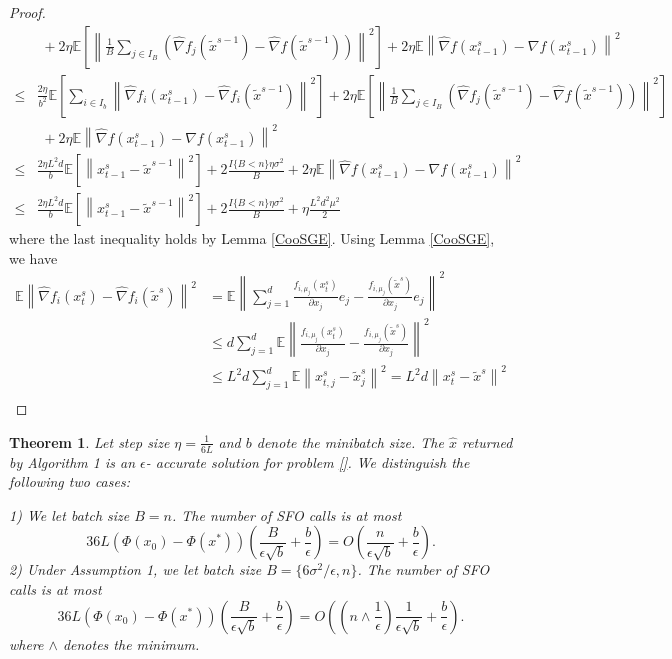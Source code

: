 \documentclass{article}
\newcommand*{\E}{\mathbb{E}}
\newcommand{\norm}[1]{\left\lVert#1\right\rVert}
\newtheorem{theorem}{Theorem}[section]
\theoremstyle{definition}
\theoremstyle{remark}
\begin{document}
\begin{proof}
{\begin{align}
   &\,\, \label{eq27}+ 2\eta \E \left[ \norm{\frac{1}{B}\sum_{j\in I_B}\left(\hat{\nabla} f_j(\widetilde{x}^{s-1}) - \hat{\nabla} f(\tilde{x}^{s-1})\right)}^2\right]+2\eta \E \norm{\hat{\nabla} f(x_{t-1}^s)-\nabla f(x_{t-1}^s)}^2\\
   \leq  &\label{eq28}\frac{2\eta}{b^2}\E\left[\sum_{i\in I_b}\norm{\hat{\nabla} f_i(x_{t-1}^s)-\hat{\nabla} f_i(\widetilde{x}^{s-1})}^2\right]+ 2\eta \E \left[ \norm{\frac{1}{B}\sum_{j\in I_B}\left(\hat{\nabla} f_j(\widetilde{x}^{s-1}) - \hat{\nabla} f(\tilde{x}^{s-1})\right)}^2\right]\\
   &\,\,+2\eta \E \norm{\hat{\nabla} f(x_{t-1}^s)-\nabla f(x_{t-1}^s)}^2\\
   \leq  &\label{eq29}\frac{2\eta L^2 d}{b}\E\left[\norm{x_{t-1}^s-\widetilde{x}^{s-1}}^2\right]+ 2\frac{I\{B < n\}\eta \sigma ^2}{B}+2\eta \E \norm{\hat{\nabla} f(x_{t-1}^s)-\nabla f(x_{t-1}^s)}^2\\
   \leq  &\label{eq29}\frac{2\eta L^2 d}{b}\E\left[\norm{x_{t-1}^s-\widetilde{x}^{s-1}}^2\right]+ 2\frac{I\{B < n\}\eta \sigma ^2}{B}+\eta \frac{L^2 d^2 \mu^2}{2}
 \end{align}
 }
 where the last inequality holds by Lemma \ref{CooSGE}. Using Lemma \ref{CooSGE}, we have 
 \begin{equation}
 \begin{split}
 \E \norm{\hat{\nabla} f_i(x_{t}^s)-\hat{\nabla} f_i(\tilde{x}^s)}^2 &= \E \norm{ \sum_{j=1}^d\frac{f_{i,\mu_j}(x_{t}^s)}{\partial x_j}e_j-\frac{f_{i,\mu_j}(\tilde{x}^s)}{\partial x_j}e_j}^2\\
 &\leq d \sum_{j=1}^d \E \norm{ \frac{f_{i,\mu_j}(x_{t}^s)}{\partial x_j}-\frac{f_{i,\mu_j}(\tilde{x}^s)}{\partial x_j}}^2\\
 &\leq L^2 d \sum_{j=1}^d \E \norm{x_{t,j}^s-\tilde{x}_{j}^s}^2 = L^2 d \norm{x_{t}^s-\tilde{x}^s}^2\\
 \end{split}
 \end{equation}
 
\end{proof}
\begin{theorem}\label{theo1}
Let step size $\eta=\frac{1}{6L}$ and $b$ denote the minibatch size. The $\hat{x}$ returned by Algorithm 1  is an $\epsilon$- accurate solution for problem \ref{}. We distinguish the following two cases:

1) We let batch size $B=n$. The number of SFO calls is at most 
\[
36 L (\Phi(x_0)-\Phi(x^*))\left(\frac{B}{\epsilon\sqrt{b}}+\frac{b}{\epsilon}\right) = O\left(\frac{n}{\epsilon \sqrt{b}}+\frac{b}{\epsilon}\right).
\]
2) Under Assumption 1, we let batch size $B = \{6\sigma^2/\epsilon, n\}$. The number of SFO calls is at most 
\[
36 L (\Phi(x_0)-\Phi(x^*))\left(\frac{B}{\epsilon\sqrt{b}}+\frac{b}{\epsilon}\right) = O\left((n\wedge \frac{1}{\epsilon})\frac{1}{\epsilon \sqrt{b}}+\frac{b}{\epsilon}\right).
\]
where $\wedge$ denotes the minimum.
\end{theorem}
\end{document}
